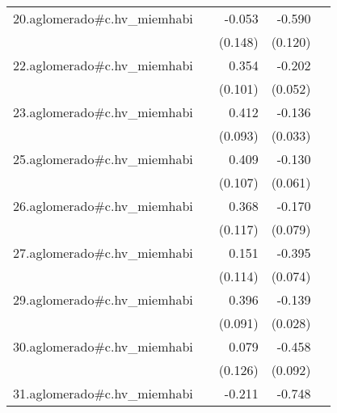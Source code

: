 {\begin{longtable}{l*{4}{D{.}{.}{-1}}}
\addlinespace
20.aglomerado#c.hv\_miemhabi&                     &      -0.053         &      -0.590\sym{***}&                     \\
            &                     &     (0.148)         &     (0.120)         &                     \\
\addlinespace
22.aglomerado#c.hv\_miemhabi&                     &       0.354\sym{***}&      -0.202\sym{***}&                     \\
            &                     &     (0.101)         &     (0.052)         &                     \\
\addlinespace
23.aglomerado#c.hv\_miemhabi&                     &       0.412\sym{***}&      -0.136\sym{***}&                     \\
            &                     &     (0.093)         &     (0.033)         &                     \\
\addlinespace
25.aglomerado#c.hv\_miemhabi&                     &       0.409\sym{***}&      -0.130\sym{*}  &                     \\
            &                     &     (0.107)         &     (0.061)         &                     \\
\addlinespace
26.aglomerado#c.hv\_miemhabi&                     &       0.368\sym{**} &      -0.170\sym{*}  &                     \\
            &                     &     (0.117)         &     (0.079)         &                     \\
\addlinespace
27.aglomerado#c.hv\_miemhabi&                     &       0.151         &      -0.395\sym{***}&                     \\
            &                     &     (0.114)         &     (0.074)         &                     \\
\addlinespace
29.aglomerado#c.hv\_miemhabi&                     &       0.396\sym{***}&      -0.139\sym{***}&                     \\
            &                     &     (0.091)         &     (0.028)         &                     \\
\addlinespace
30.aglomerado#c.hv\_miemhabi&                     &       0.079         &      -0.458\sym{***}&                     \\
            &                     &     (0.126)         &     (0.092)         &                     \\
\addlinespace
31.aglomerado#c.hv\_miemhabi&                     &      -0.211         &      -0.748\sym{***}&                     \\

\end{longtable}}
